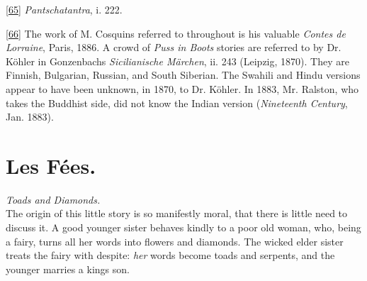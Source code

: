 \documentclass[14pt,a4paper]{memoir}
\begin{document}
\protect\hypertarget{4533318093929944247_33931-h-1.htm.xhtmlux5cux23Footnote_65}{}{}\protect\hyperlink{4533318093929944247_33931-h-0.htm.xhtmlux5cux23FNanchor_65}{{{[}65{]}}}
\emph{Pantschatantra}, i. 222.

\protect\hypertarget{4533318093929944247_33931-h-1.htm.xhtmlux5cux23Footnote_66}{}{}\protect\hyperlink{4533318093929944247_33931-h-1.htm.xhtmlux5cux23FNanchor_66}{{{[}66{]}}}
The work of M. Cosquin\textquotesingle s referred to throughout is his
valuable \emph{Contes de Lorraine}, Paris, 1886. A crowd of \emph{Puss
in Boots} stories are referred to by Dr. Köhler in
Gonzenbach\textquotesingle s \emph{Sicilianische Märchen}, ii. 243
(Leipzig, 1870). They are Finnish, Bulgarian, Russian, and South
Siberian. The Swahili and Hindu versions appear to have been unknown, in
1870, to Dr. Köhler. In 1883, Mr. Ralston, who takes the Buddhist side,
did not know the Indian version (\emph{Nineteenth Century}, Jan. 1883).

\section{Les Fées.}

\emph{Toads and Diamonds.} \\

The origin of this little story is so manifestly moral, that there is
little need to discuss it. A good younger sister behaves kindly to a
poor old woman, who, being a fairy, turns all her words into flowers and
diamonds. The wicked elder sister treats the fairy with despite:
\emph{her} words become toads and serpents, and the younger marries a
king\textquotesingle s son.
\end{document}
